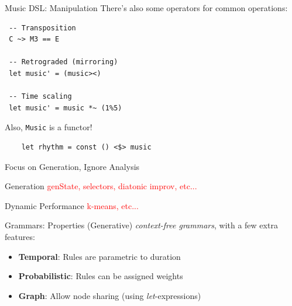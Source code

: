 \documentclass{beamer}
\newcommand{\icode}[1]{\texttt{#1}}
\newcommand\todo[1]{\textcolor{red}{#1}}
\begin{document}
    \begin{frame}[fragile=singleslide]{Music DSL: Manipulation}
	There's also some operators for common operations:

    \begin{verbatim}
 -- Transposition
 C ~> M3 == E

 -- Retrograded (mirroring)
 let music' = (music><)

 -- Time scaling
 let music' = music *~ (1%5)

    \end{verbatim}

	Also, \icode{Music} is a functor!

	\begin{verbatim}
	let rhythm = const () <$> music
    \end{verbatim}
	\end{frame}

	{
	\begin{frame}{Focus on Generation, Ignore Analysis}
	\end{frame}
	}

	\begin{frame}{Generation}
	\todo{genState, selectors, diatonic improv, etc...}
	\end{frame}

	\begin{frame}{Dynamic Performance}
	\todo{k-means, etc...}
	\end{frame}

	\begin{frame}[fragile=singleslide]{Grammars: Properties}
    (Generative) \textit{context-free grammars}, with a few extra features:
	\begin{itemize}
	\item \textbf{Temporal}: Rules are parametric to duration
	\item \textbf{Probabilistic}: Rules can be assigned weights
	\item \textbf{Graph}: Allow node sharing (using \textit{let}-expressions)
	\end{itemize}
	\end{frame}
\end{document}
